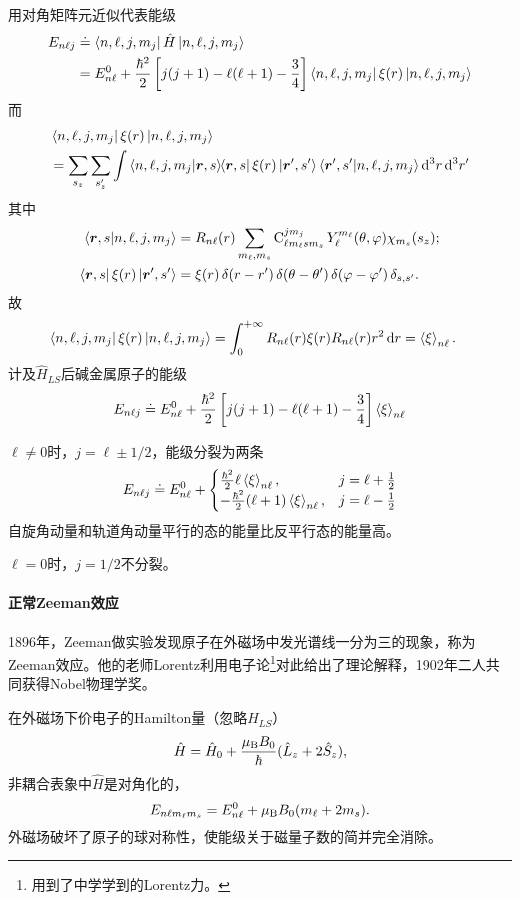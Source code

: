 用对角矩阵元近似代表能级
\begin{align*}
	E_{n\ell j}&\doteq\bra{n,\ell,j,m_j}\hat H\ket{n,\ell,j,m_j}\\
	&=E_{n\ell}^0+\frac{\hbar^2}2\fkh{j(j+1)-\ell(\ell+1)-\frac34}\bra{n,\ell,j,m_j}\xi(r)\ket{n,\ell,j,m_j}
\end{align*}
而
\begin{align*}
	&\bra{n,\ell,j,m_j}\xi(r)\ket{n,\ell,j,m_j}\\
	&=\sum_{s_z}\sum_{s_z'}\int\brkt{n,\ell,j,m_j}{\r,s}\bs3\bra{\r,s}\xi(r)\ket{\r',s'}\brkt{\r',s'}{n,\ell,j,m_j}\d^3r\d^3r'
\end{align*}
其中 
\begin{align*}
	\brkt{\r,s}{n,\ell,j,m_j}&=R_{n\ell}(r)\sum_{m_\ell,m_s}\Cle_{\ell m_\ell sm_s}^{jm_j}Y_\ell^{m_\ell}(\theta,\varphi)\chi_{m_s}(s_z);\\
	\bra{\r,s}\xi(r)\ket{\r',s'}&=\xi(r)\vd(r-r')\vd(\theta-\theta')\vd(\varphi-\varphi')\vd_{s,s'}.
\end{align*}
故
\begin{align*}
	\bra{n,\ell,j,m_j}\xi(r)\ket{n,\ell,j,m_j}&=\int\zti R_{n\ell}(r)\xi(r)R_{n\ell}(r)r^2\d r%
	=\ave\xi_{n\ell}.
\end{align*}
计及$\hat H_{LS}$后碱金属原子的能级
\[E_{n\ell j}\doteq E_{n\ell}^0+\frac{\hbar^2}2\fkh{j(j+1)-\ell(\ell+1)-\frac34}\ave\xi_{n\ell}\]

$\ell\neq 0$时，$j=\ell\pm 1/2$，能级分裂为两条
\[E_{n\ell j}\doteq E_{n\ell}^0+\begin{cases}
	\frac{\hbar^2}2\ell\ave\xi_{n\ell},& j=\ell+\frac12\\
	-\frac{\hbar^2}2(\ell+1)\ave\xi_{n\ell},& j=\ell-\frac12
\end{cases}\]
自旋角动量和轨道角动量平行的态的能量比反平行态的能量高。

$\ell=0$时，$j=1/2$不分裂。
\paragraph*{正常Zeeman效应}1896年，Zeeman做实验发现原子在外磁场中发光谱线一分为三的现象，称为Zeeman效应。他的老师Lorentz利用电子论\footnote{用到了中学学到的Lorentz力。}对此给出了理论解释，1902年二人共同获得Nobel物理学奖。

在外磁场下价电子的Hamilton量（忽略$\hat H_{LS}$）
\[\hat H=\hat H_0+\frac{\muB B_0}\hbar(\hat L_z+2\hat S_z),\]
非耦合表象中$\hat H$是对角化的，
\[E_{n\ell m_\ell m_s}=E_{n\ell}^0+\muB B_0(m_\ell+2m_s).\]
外磁场破坏了原子的球对称性，使能级关于磁量子数的简并完全消除。%

